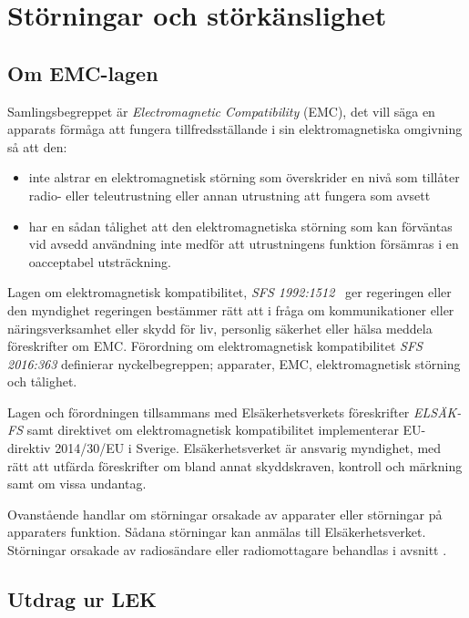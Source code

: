 \section{Störningar och störkänslighet}

\subsection{Om EMC-lagen}
\label{EMC-lagen}

Samlingsbegreppet är \emph{Electromagnetic Compatibility} (EMC), det vill säga
en apparats förmåga att fungera tillfredsställande i sin elektromagnetiska
omgivning så att den:

\begin{itemize}
\item inte alstrar en elektromagnetisk störning som överskrider en nivå som
  tillåter radio- eller teleutrustning eller annan utrustning att fungera som
  avsett

\item har en sådan tålighet att den elektromagnetiska störning som kan
  förväntas vid avsedd användning inte medför att utrustningens funktion
  försämras i en oacceptabel utsträckning.
\end{itemize}

Lagen om elektromagnetisk kompatibilitet,
\emph{SFS 1992:1512}~\cite{SFS1992:1512}
ger regeringen eller den myndighet regeringen bestämmer rätt att i fråga om
kommunikationer eller näringsverksamhet eller skydd för liv, personlig säkerhet
eller hälsa meddela föreskrifter om EMC.
Förordning om elektromagnetisk kompatibilitet \emph{SFS 2016:363}
\cite{SFS2016:363} definierar nyckelbegreppen; apparater, EMC, elektromagnetisk
störning och tålighet.

Lagen och förordningen tillsammans med Elsäkerhetsverkets föreskrifter
\emph{ELSÄK-FS} samt direktivet om elektromagnetisk kompatibilitet implementerar
EU-direktiv 2014/30/EU i Sverige.
Elsäkerhetsverket är ansvarig myndighet, med rätt att utfärda föreskrifter om
bland annat skyddskraven, kontroll och märkning samt om vissa undantag.

Ovanstående handlar om störningar orsakade av apparater eller störningar på
apparaters funktion.
Sådana störningar kan anmälas till Elsäkerhetsverket.
Störningar orsakade av radiosändare eller radiomottagare behandlas i avsnitt
.

\newpage
\subsection{Utdrag ur LEK}
\label{LEK}

